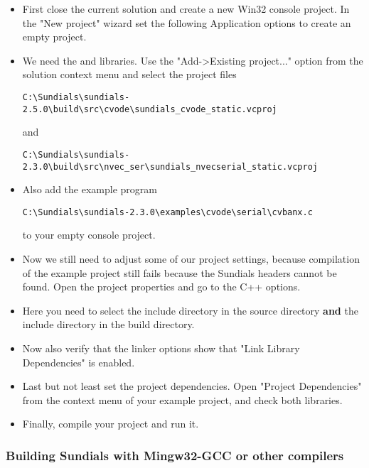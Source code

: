 \begin{itemize}

\item First close the current solution and create a new Win32 console project. 
In the "New project" wizard set the following Application options to create an empty project.

\item We need the {\cvode} and {\nvecs} libraries. 
Use the "Add->Existing project..." option from the solution context menu and select 
the project files
\begin{verbatim}
C:\Sundials\sundials-2.5.0\build\src\cvode\sundials_cvode_static.vcproj
\end{verbatim}
and
\begin{verbatim}
C:\Sundials\sundials-2.3.0\build\src\nvec_ser\sundials_nvecserial_static.vcproj
\end{verbatim}

\item Also add the example program 
\begin{verbatim}
C:\Sundials\sundials-2.3.0\examples\cvode\serial\cvbanx.c
\end{verbatim}
to your empty console project. 

\item Now we still need to adjust some of our project settings, because compilation of 
the example project still fails because the Sundials headers cannot be found. 
Open the project properties and go to the C++ options.

\item Here you need to select the include directory in the {\sundials} source directory 
{\bf and} the include directory in the {\sundials} build directory.

\item Now also verify that the linker options show that "Link Library Dependencies" is enabled.

\item Last but not least set the project dependencies. Open "Project Dependencies" from the context 
menu of your example project, and check both {\sundials} libraries.

\item Finally, compile your project and run it.

\end{itemize}


\subsubsection*{Building Sundials with Mingw32-GCC or other compilers}


